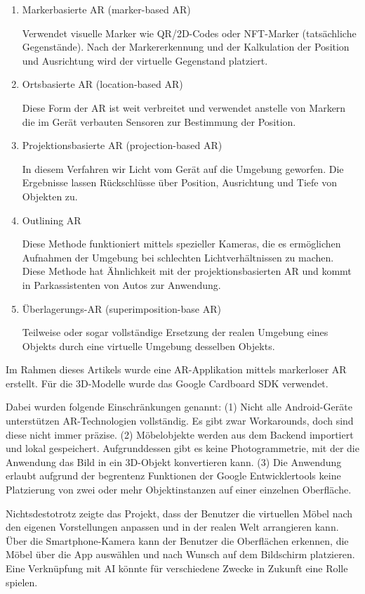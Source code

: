 \documentclass[12pt,paper=a4,oneside,hidelinks,headings=small,captions=heading,captions=nooneline]{scrartcl}
\begin{document}
\begin{enumerate}
\item Markerbasierte AR (marker-based AR)

Verwendet visuelle Marker wie QR/2D-Codes oder NFT-Marker
(tatsächliche Gegenstände). Nach der Markererkennung und der
Kalkulation der Position und Ausrichtung wird der virtuelle
Gegenstand platziert.

\item Ortsbasierte AR (location-based AR)

Diese Form der AR ist weit verbreitet und verwendet anstelle von
Markern die im Gerät verbauten Sensoren zur Bestimmung der
Position.

\item Projektionsbasierte AR (projection-based AR)   

In diesem Verfahren wir Licht vom Gerät auf die Umgebung
geworfen. Die Ergebnisse lassen Rückschlüsse über Position,
Ausrichtung und Tiefe von Objekten zu.

\item Outlining AR

Diese Methode funktioniert mittels spezieller Kameras, die es
ermöglichen Aufnahmen der Umgebung bei schlechten
Lichtverhältnissen zu machen. Diese Methode hat Ähnlichkeit mit der
projektionsbasierten AR und kommt in Parkassistenten von Autos zur
Anwendung.

\item Überlagerungs-AR (superimposition-base AR)

Teilweise oder sogar vollständige Ersetzung der realen Umgebung
eines Objekts durch eine virtuelle Umgebung desselben Objekts.
\end{enumerate}

Im Rahmen dieses Artikels wurde eine AR-Applikation mittels
markerloser AR erstellt. Für die 3D-Modelle wurde das Google Cardboard
SDK verwendet.

Dabei wurden folgende Einschränkungen genannt: (1) Nicht alle
Android-Geräte unterstützen AR-Technologien vollständig. Es gibt zwar
Workarounds, doch sind diese nicht immer präzise. (2) Möbelobjekte
werden aus dem Backend importiert und lokal
gespeichert. Aufgrunddessen gibt es keine Photogrammetrie, mit der die
Anwendung das Bild in ein 3D-Objekt konvertieren kann. (3) Die
Anwendung erlaubt aufgrund der begrentenz Funktionen der Google
Entwicklertools keine Platzierung von zwei oder mehr Objektinstanzen
auf einer einzelnen Oberfläche.

Nichtsdestotrotz zeigte das Projekt, dass der Benutzer die virtuellen
Möbel nach den eigenen Vorstellungen anpassen und in der realen Welt
arrangieren kann. Über die Smartphone-Kamera kann der Benutzer die
Oberflächen erkennen, die Möbel über die App auswählen und nach Wunsch
auf dem Bildschirm platzieren. Eine Verknüpfung mit AI könnte für
verschiedene Zwecke in Zukunft eine Rolle spielen.
\end{document}
